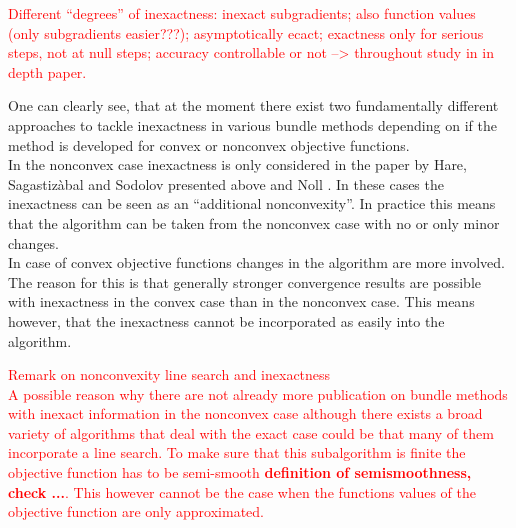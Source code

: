 \textcolor{red}{Different ``degrees'' of inexactness: inexact subgradients; also function values (only subgradients easier???); asymptotically ecact; exactness only for serious steps, not at null steps; accuracy controllable or not --> throughout study in in depth paper.}

One can clearly see, that at the moment there exist two fundamentally different approaches to tackle inexactness in various bundle methods depending on if the method is developed for convex or nonconvex objective functions. \\
In the nonconvex case inexactness is only considered in the paper by Hare, Sagastiz{\`{a}}bal and Sodolov \cite{Hare2016} presented above and Noll \cite{Noll2013}. In these cases the inexactness can be seen as an ``additional nonconvexity''. In practice this means that the algorithm can be taken from the nonconvex case with no or only minor changes. \\
In case of convex objective functions changes in the algorithm are more involved. The reason for this is that generally stronger convergence results are possible with inexactness in the convex case than in the nonconvex case. This means however, that the inexactness cannot be incorporated as easily into the algorithm.

\textcolor{red}{Remark on nonconvexity line search and inexactness \\
A possible reason why there are not already more publication on bundle methods with inexact information in the nonconvex case although there exists a broad variety of algorithms that deal with the exact case could be that many of them incorporate a line search. To make sure that this subalgorithm is finite the objective function has to be semi-smooth \textbf{definition of semismoothness, check ...}. This however cannot be the case when the functions values of the objective function are only approximated.} \\

